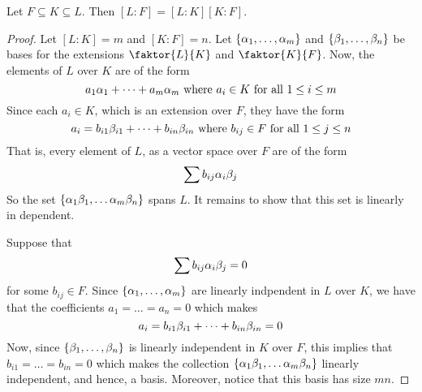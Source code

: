   \begin{theorem}\label{theorem_8.2.4}
    Let $F \subseteq K \subseteq L$. Then  $[L:F]=[L:K][K:F]$.
  \end{theorem}
  \begin{proof}
    Let $[L:K]=m$ and $[K:F]=n$. Let $\{\alpha_1, \dots, \alpha_m\}$ and $\{\beta_1,
    \dots, \beta_n\}$ be bases for the extensions $\faktor{L}{K}$ and
    $\faktor{K}{F}$. Now, the elements of $L$ over  $K$ are of the form
    \begin{equation*}
      a_1\alpha_1+\dots+a_m\alpha_m \text{ where } a_i \in K \text{ for all } 1 \leq
      i \leq m
    \end{equation*}
    Since each $a_i \in K$, which is an extension over  $F$, they have the form
    \begin{equation*}
      a_i=b_{i1}\beta_{i1}+\dots+b_{in}\beta_{in} \text{ where } b_{ij} \in F
      \text{ for all } 1 \leq j \leq n
    \end{equation*}
    That is, every element of $L$, as a vector space over $F$ are of the form
    \begin{equation*}
      \sum{b_{ij}\alpha_i\beta_j}
    \end{equation*}
    So the set $\{\alpha_1\beta_1, \dots \alpha_m\beta_n\}$ spans $L$. It remains to show that
    this set is linearly in dependent.

    Suppose that
    \begin{equation*}
      \sum{b_{ij}\alpha_i\beta_j}=0
    \end{equation*}
    for some $b_{ij} \in F$. Since $\{\alpha_1, \dots, \alpha_m\}$ are linearly
    indpendent in $L$ over  $K$, we have that the coefficients
    $a_1=\dots=a_n=0$ which makes
    \begin{equation*}
      a_i=b_{i1}\beta_{i1}+\dots+b_{in}\beta_{in}=0
    \end{equation*}
    Now, since $\{\beta_1, \dots, \beta_n\}$ is linearly independent in $K$ over
    $F$, this implies that $b_{i1}=\dots=b_{in}=0$ which makes the collection
    $\{\alpha_1\beta_1, \dots \alpha_m\beta_n\}$ linearly independent, and hence, a basis.
    Moreover, notice that this basis has size $mn$.
  \end{proof}

